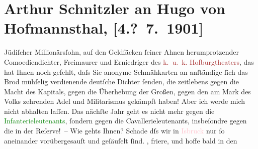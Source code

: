 

               \section[Arthur Schnitzler an Hugo von Hofmannsthal, {[}4.? 7. 1901{]}]{ Arthur Schnitzler an Hugo von Hofmannsthal, {[}4.? 7. 1901{]}}\nopagebreak{}\rehead{ }\normalsize\beginnumbering{} \toendnotes[C]{\smallbreak\pagebreak[2]} 
\toendnotes[C]{\smallbreak}\pstart
           \noindent{}{\pb}Jüdiſcher Millionärsſohn, auf den Geldſäcken ſeiner Ahnen
               herumprotzender Comoediendichter, Freimaurer und Erniedriger des \textcolor{brown}{k. u. k. Hofburgtheaters}{}\ledrightnote{\textcolor{brown}{Burgtheater}}, das hat Ihnen noch gefehlt, daſs Sie
               anonyme Schmähkarten an anſtändige ſich das Brod mühſelig verdienende deutſche
               Dichter ſenden, die zeitlebens gegen die Macht des Kapitals, gegen die Über{\pb}hebung der Großen, gegen den am Mark des Volks zehrenden
               Adel und Militarismus gekämpft haben! Aber ich werde mich nicht abhalten laſſen. Das
               nächſte Jahr geht es nicht mehr gegen die \textcolor{green}{Infanterieleutenants}{}, ſondern gegen die
               Cavallerieleutenants, insbeſondre gegen die in der Reſerve! –\pend
           \pstart
           Wie gehts Ihnen? Schade dſs {\pb}wir in \textcolor{pink}{I{\geminationn}sbruck}{}\ledrightnote{\textcolor{pink}{Innsbruck}} nur ſo aneinander
               vorübergesauſt und geſäuſelt ſind. \label{K_L01142_1v}\label{K_L01142_1h}, friere, und hoffe bald in den
